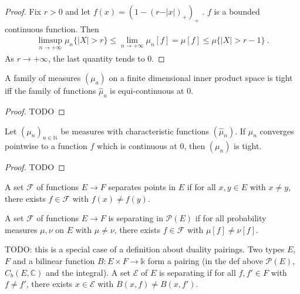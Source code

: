 \begin{proof}
Fix $r > 0$ and let $f(x) = (1 - (r - \vert x \vert)_+)_+$ . $f$ is a bounded continuous function. Then
\begin{align*}
\limsup_{n \to +\infty} \mu_n\{\vert X \vert > r\}
\le \lim_{n \to +\infty} \mu_n\left[ f \right]
= \mu[f]
\le \mu\{\vert X \vert > r - 1\} \: .
\end{align*}
As $r \to +\infty$, the last quantity tends to 0.
\end{proof}

\begin{lemma}\label{lem:tight_iff_charFun_equiContinuous}
A family of measures $(\mu_a)$ on a finite dimensional inner product space is tight iff the family of functions $\hat{\mu}_a$ is equi-continuous at 0.
\end{lemma}

\begin{proof}
TODO
\end{proof}

\begin{lemma}\label{lem:tight_of_tendsto_charFun}
Let $(\mu_n)_{n \in \mathbb{N}}$ be measures with characteristic functions $(\hat{\mu}_n)$. If $\hat{\mu}_n$ converges pointwise to a function $f$ which is continuous at 0, then $(\mu_n)$ is tight.
\end{lemma}

\begin{proof}
TODO
\end{proof}

\begin{definition}\label{def:separates_points}
 \leanok
A set $\mathcal F$ of functions $E \to F$ separates points in $E$ if for all $x, y \in E$ with $x \ne y$, there exists $f \in \mathcal F$ with $f(x) \ne f(y)$.
\end{definition}

\begin{definition}\label{def:separating}
A set $\mathcal F$ of functions $E \to F$ is separating in $\mathcal P(E)$ if for all probability measures $\mu, \nu$ on $E$ with $\mu \ne \nu$, there exists $f \in \mathcal F$ with $\mu[f] \ne \nu[f]$.
\end{definition}

TODO: this is a special case of a definition about duality pairings. Two types $E$, $F$ and a bilinear function $B : E \times F \to \mathbb{k}$ form a pairing (in the def above $\mathcal P(E)$, $C_b(E, \mathbb{C})$ and the integral). A set $\mathcal E$ of $E$ is separating if for all $f, f' \in F$ with $f \ne f'$, there exists $x \in \mathcal E$ with $B(x, f) \ne B(x, f')$. 

